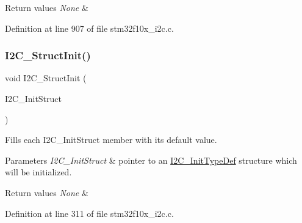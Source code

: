 \begin{DoxyRetVals}{Return values}
{\em None} & \\
\hline
\end{DoxyRetVals}


Definition at line 907 of file stm32f10x\+\_\+i2c.\+c.

\mbox{\label{group___i2_c___private___functions_ga08582aca6d7d7910cd5cbff0d9def350}} 
\subsubsection{\texorpdfstring{I2\+C\+\_\+\+Struct\+Init()}{I2C\_StructInit()}}
{\footnotesize\ttfamily void I2\+C\+\_\+\+Struct\+Init (\begin{DoxyParamCaption}\item[{\hyperlink{struct_i2_c___init_type_def}{I2\+C\+\_\+\+Init\+Type\+Def} $\ast$}]{I2\+C\+\_\+\+Init\+Struct }\end{DoxyParamCaption})}



Fills each I2\+C\+\_\+\+Init\+Struct member with its default value. 


\begin{DoxyParams}{Parameters}
{\em I2\+C\+\_\+\+Init\+Struct} & pointer to an \hyperlink{struct_i2_c___init_type_def}{I2\+C\+\_\+\+Init\+Type\+Def} structure which will be initialized. \\
\hline
\end{DoxyParams}

\begin{DoxyRetVals}{Return values}
{\em None} & \\
\hline
\end{DoxyRetVals}


Definition at line 311 of file stm32f10x\+\_\+i2c.\+c.

\mbox{\label{group___i2_c___private___functions_gaa27d1440290fe601e730b6980999afe3}} 
